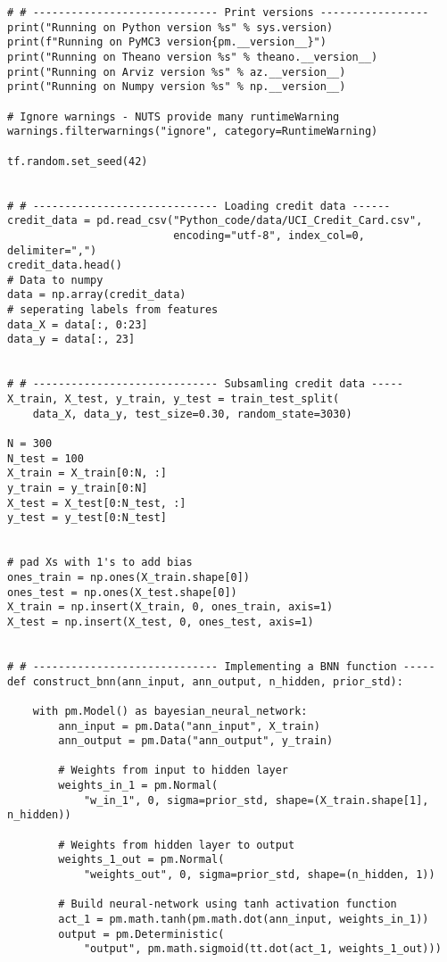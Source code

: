 \begin{appendices}
\begin{lstlisting}
# # ----------------------------- Print versions -----------------
print("Running on Python version %s" % sys.version)
print(f"Running on PyMC3 version{pm.__version__}")
print("Running on Theano version %s" % theano.__version__)
print("Running on Arviz version %s" % az.__version__)
print("Running on Numpy version %s" % np.__version__)

# Ignore warnings - NUTS provide many runtimeWarning
warnings.filterwarnings("ignore", category=RuntimeWarning)

tf.random.set_seed(42)


# # ----------------------------- Loading credit data ------
credit_data = pd.read_csv("Python_code/data/UCI_Credit_Card.csv",
                          encoding="utf-8", index_col=0, delimiter=",")
credit_data.head()
# Data to numpy
data = np.array(credit_data)
# seperating labels from features
data_X = data[:, 0:23]
data_y = data[:, 23]


# # ----------------------------- Subsamling credit data -----
X_train, X_test, y_train, y_test = train_test_split(
    data_X, data_y, test_size=0.30, random_state=3030)

N = 300
N_test = 100
X_train = X_train[0:N, :]
y_train = y_train[0:N]
X_test = X_test[0:N_test, :]
y_test = y_test[0:N_test]


# pad Xs with 1's to add bias
ones_train = np.ones(X_train.shape[0])
ones_test = np.ones(X_test.shape[0])
X_train = np.insert(X_train, 0, ones_train, axis=1)
X_test = np.insert(X_test, 0, ones_test, axis=1)


# # ----------------------------- Implementing a BNN function -----
def construct_bnn(ann_input, ann_output, n_hidden, prior_std):

    with pm.Model() as bayesian_neural_network:
        ann_input = pm.Data("ann_input", X_train)
        ann_output = pm.Data("ann_output", y_train)

        # Weights from input to hidden layer
        weights_in_1 = pm.Normal(
            "w_in_1", 0, sigma=prior_std, shape=(X_train.shape[1], n_hidden))

        # Weights from hidden layer to output
        weights_1_out = pm.Normal(
            "weights_out", 0, sigma=prior_std, shape=(n_hidden, 1))

        # Build neural-network using tanh activation function
        act_1 = pm.math.tanh(pm.math.dot(ann_input, weights_in_1))
        output = pm.Deterministic(
            "output", pm.math.sigmoid(tt.dot(act_1, weights_1_out)))


\end{lstlisting}
\end{appendices}
